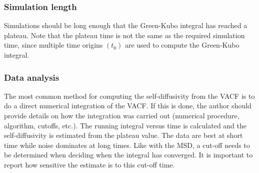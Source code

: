 \documentclass[9pt,bestpractices]{livecoms}
\begin{document}
\subsubsection{Simulation length} \label{sec:Self-Diffusivity:Green-Kubo: Simulation length}

Simulations should be long enough that the Green-Kubo integral has reached a plateau. Note that the plateau time is not the same as the required simulation time, since multiple time origins $(t_0)$ are used to compute the Green-Kubo integral.

\subsubsection{Data analysis} \label{sec:Self-Diffusivity:Green-Kubo: Data analysis}

The most common method for computing the self-diffusivity from the VACF is to do a direct numerical integration of the VACF. If this is done, the author should provide details on how the integration was carried out (numerical procedure, algorithm, cutoffs, etc.). The running integral versus time is calculated and the self-diffusivity is estimated from the plateau value. The data are best at short time while noise dominates at long times. Like with the MSD, a cut-off needs to be determined when deciding when the integral has converged. It is important to report how sensitive the estimate is to this cut-off time. 

%
\end{document}
